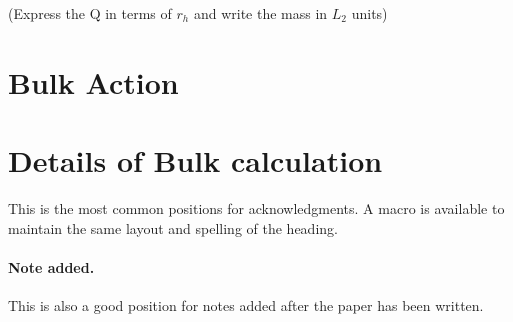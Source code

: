 \documentclass[a4paper,11pt]{article}
\begin{document}
(Express the Q in terms of $r_h$ and write the mass in $L_2$ units)

\section{Bulk Action}

\label{sec:Bulk Action}



\appendix
\section{Details of Bulk calculation}
\label{sec: Appendix A}





\acknowledgments

This is the most common positions for acknowledgments. A macro is
available to maintain the same layout and spelling of the heading.

\paragraph{Note added.} This is also a good position for notes added
after the paper has been written.



\end{document}

